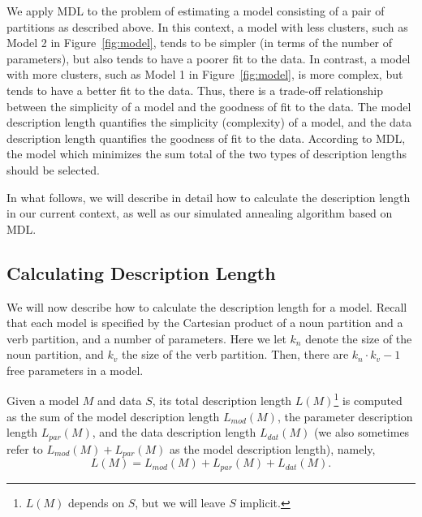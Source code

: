 We apply MDL to the problem of estimating a model consisting of a pair
of partitions as described above. In this context, a model with less
clusters, such as Model 2 in Figure~\ref{fig:model}, tends to be
simpler (in terms of the number of parameters), but also tends to have
a poorer fit to the data. In contrast, a model with more clusters,
such as Model 1 in Figure~\ref{fig:model}, is more complex, but tends
to have a better fit to the data. Thus, there is a trade-off
relationship between the simplicity of a model and the goodness of fit
to the data. The model description length quantifies the simplicity
(complexity) of a model, and the data description length quantifies
the goodness of fit to the data. According to MDL, the model which
minimizes the sum total of the two types of description lengths should
be selected.

In what follows, we will describe in detail how to calculate the
description length in our current context, as well as our simulated
annealing algorithm based on MDL.

\subsection{Calculating Description Length}
We will now describe how to calculate the description length for a
model. Recall that each model is specified by the Cartesian product of
a noun partition and a verb partition, and a number of parameters. 
Here we let $k_n$ denote the size of the noun partition, and $k_v$ the
size of the verb partition. Then, there are $k_n \cdot k_v - 1$ free
parameters in a model.

Given a model $M$ and data $S$, its total description length
$L(M)$\footnote{$L(M)$ depends on $S$, but we will leave $S$
  implicit.} is computed as the sum of the model description length
$L_{mod}(M)$, the parameter description length $L_{par}(M)$, and the
data description length $L_{dat}(M)$ (we also sometimes refer to
$L_{mod}(M) + L_{par}(M)$ as the model description length), namely,
\begin{equation} L(M) = L_{mod}(M) + L_{par}(M) + L_{dat}(M).
\end{equation}


